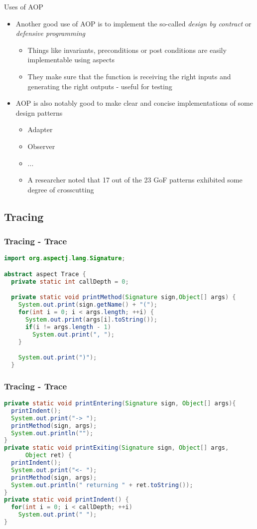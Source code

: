 \documentclass[11pt]{beamer}
\begin{document}
\begin{frame}{Uses of AOP}
\begin{itemize}
   \item Another good use of AOP is to implement the so-called \emph{design by contract} or \emph{defensive programming}
   \begin{itemize}
      \item Things like invariants, preconditions or post conditions are easily implementable using aspects
      \item They make sure that the function is receiving the right inputs and generating the right outputs - useful for testing
   \end{itemize}
   \item AOP is also notably good to make clear and concise implementations of some design patterns
      \begin{itemize}
         \item Adapter
         \item Observer
         \item ...
         \item A researcher noted that 17 out of the 23 GoF patterns exhibited some degree of crosscutting %
      \end{itemize}
\end{itemize}
\end{frame}

\subsection*{Tracing}
\begin{frame}[fragile]
   \frametitle{Tracing - Trace}
   {\scriptsize
   \begin{lstlisting}[language=java]
import org.aspectj.lang.Signature;

abstract aspect Trace {
  private static int callDepth = 0;

  private static void printMethod(Signature sign,Object[] args) {
    System.out.print(sign.getName() + "(");
    for(int i = 0; i < args.length; ++i) {
      System.out.print(args[i].toString());
      if(i != args.length - 1)
        System.out.print(", ");
    }

    System.out.print(")");
  }
   \end{lstlisting}}
\end{frame}

\begin{frame}[fragile]
   \frametitle{Tracing - Trace}
   {\scriptsize
   \begin{lstlisting}[language=java]
private static void printEntering(Signature sign, Object[] args){
  printIndent();
  System.out.print("-> ");
  printMethod(sign, args);
  System.out.println("");
}
private static void printExiting(Signature sign, Object[] args,
      Object ret) {
  printIndent();
  System.out.print("<- ");
  printMethod(sign, args);
  System.out.println(" returning " + ret.toString());
}
private static void printIndent() {
  for(int i = 0; i < callDepth; ++i)
    System.out.print(" ");
}
   \end{lstlisting}}
\end{frame}
\end{document}
